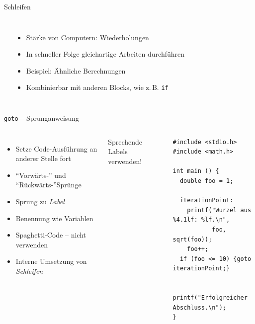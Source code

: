 \begin{frame}[fragile]{Schleifen}
%
\begin{columns}
\begin{center}
\end{center}
%
\begin{itemize}
\item Stärke von Computern: Wiederholungen
\item In schneller Folge gleichartige Arbeiten durchführen
\item Beispiel: Ähnliche Berechnungen
\item Kombinierbar mit anderen Blocks, wie z.\,B. \texttt{if}
\end{itemize}
\end{columns}
\end{frame}


\begin{frame}[fragile]{\texttt{goto} -- Sprunganweisung}
%
\begin{columns}[T]
\begin{itemize}
\item Setze Code-Ausführung an anderer Stelle fort
\item \enquote{Vorwärts-} und \enquote{Rückwärts-}Sprünge
\item Sprung zu \emph{Label}
\item Benennung wie Variablen
\item Spaghetti-Code -- nicht verwenden
\item Interne Umsetzung von \emph{Schleifen}
\end{itemize}
\begin{hintbox}
Sprechende Labels verwenden!
\end{hintbox}
%
\begin{codebox}
\begin{verbatim}
#include <stdio.h>
#include <math.h>

int main () {
  double foo = 1;

  iterationPoint:
    printf("Wurzel aus %4.1lf: %lf.\n",
           foo, sqrt(foo));
    foo++;
  if (foo <= 10) {goto iterationPoint;}
    
  printf("Erfolgreicher Abschluss.\n");
}
\end{verbatim}
\end{codebox}
\end{columns}
%
\end{frame}

